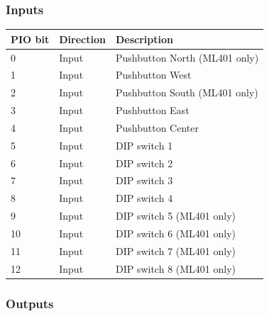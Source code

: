 \documentclass[a4paper,11pt]{article}
\begin{document}
\subsubsection{Inputs}

\begin{tabularx}{\textwidth}{|l|l|X|}
\hline
\bf{PIO bit} & \bf{Direction} & \bf{Description} \\
\hline
0 & Input & Pushbutton North (ML401 only) \\
\hline
1 & Input & Pushbutton West \\
\hline
2 & Input & Pushbutton South (ML401 only) \\
\hline
3 & Input & Pushbutton East \\
\hline
4 & Input & Pushbutton Center \\
\hline
5 & Input & DIP switch 1 \\
\hline
6 & Input & DIP switch 2 \\
\hline
7 & Input & DIP switch 3 \\
\hline
8 & Input & DIP switch 4 \\
\hline
9 & Input & DIP switch 5 (ML401 only) \\
\hline
10 & Input & DIP switch 6 (ML401 only) \\
\hline
11 & Input & DIP switch 7 (ML401 only) \\
\hline
12 & Input & DIP switch 8 (ML401 only) \\
\hline
\end{tabularx}

\subsubsection{Outputs}
\end{document}
